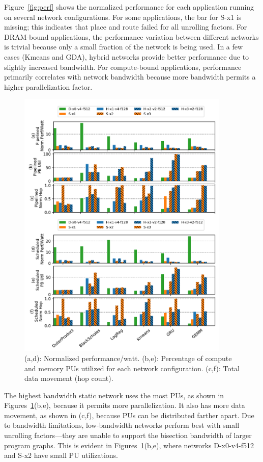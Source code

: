 Figure~\ref{fig:perf} shows the normalized performance for each application running on several network configurations.
For some applications, the bar for S-x1 is missing; this indicates that place and route failed for all unrolling factors.
For DRAM-bound applications, the performance variation between different networks is trivial because only a small fraction of the network is being used. 
In a few cases (Kmeans and GDA), hybrid networks provide better performance due to slightly increased bandwidth.
For compute-bound applications, performance primarily correlates with network bandwidth because more bandwidth permits a higher parallelization factor. 

\begin{figure}
\centering
  \includegraphics[width=0.9\textwidth]{network/figs/energy.pdf} 
\caption{(a,d): Normalized performance/watt. (b,e): Percentage of compute and memory PUs utilized for each network configuration. 
  (c,f): Total data movement (hop count).}
\label{fig:energy}
\end{figure}

The highest bandwidth static network uses the most PUs, as shown in Figures~\ref{fig:energy}(b,e), because it permits more parallelization. 
It also has more data movement, as shown in (c,f), because PUs can be distributed farther apart. 
Due to bandwidth limitations, low-bandwidth networks perform best with small unrolling factors---they are unable to support the bisection bandwidth of larger program graphs.
This is evident in Figures~\ref{fig:energy}(b,e), where networks D-x0-v4-f512 and S-x2 have small PU utilizations.

